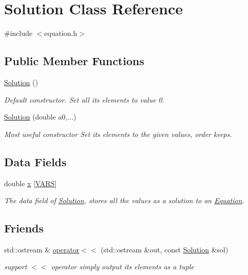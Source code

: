 \hypertarget{classSolution}{}\section{Solution Class Reference}
\label{classSolution}


{\ttfamily \#include $<$equation.\+h$>$}

\subsection*{Public Member Functions}
\begin{DoxyCompactItemize}
\item 
\hyperlink{classSolution_ab55bd4b023d596ce11aaf737b9a6123b}{Solution} ()
\begin{DoxyCompactList}\small\item\em Default constructor. Set all its elements to value 0. \end{DoxyCompactList}\item 
\hyperlink{classSolution_a2b382bc23a6b180f2ed161707da039dd}{Solution} (double a0,...)
\begin{DoxyCompactList}\small\item\em Most useful constructor Set its elements to the given values, order keeps. \end{DoxyCompactList}\end{DoxyCompactItemize}
\subsection*{Data Fields}
\begin{DoxyCompactItemize}
\item 
double \hyperlink{classSolution_a67672e91e753de458afef2ca270510dd}{x} \mbox{[}\hyperlink{config_8h_a1d6565a8ececd15de44965eec4790919}{V\+A\+RS}\mbox{]}
\begin{DoxyCompactList}\small\item\em The data field of \hyperlink{classSolution}{Solution}, stores all the values as a solution to an \hyperlink{classEquation}{Equation}. \end{DoxyCompactList}\end{DoxyCompactItemize}
\subsection*{Friends}
\begin{DoxyCompactItemize}
\item 
std\+::ostream \& \hyperlink{classSolution_a57557999df406fb734b29cff24838d80}{operator$<$$<$} (std\+::ostream \&out, const \hyperlink{classSolution}{Solution} \&sol)
\begin{DoxyCompactList}\small\item\em support $<$$<$ operator simply output its elements as a tuple \end{DoxyCompactList}\end{DoxyCompactItemize}



